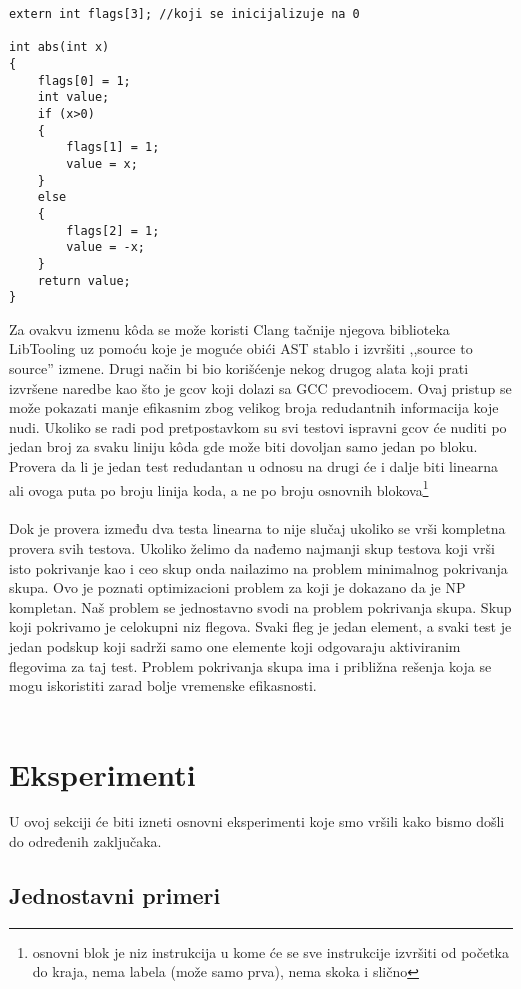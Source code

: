 \documentclass[a4paper]{article}
\begin{document}
\begin{lstlisting}
extern int flags[3]; //koji se inicijalizuje na 0

int abs(int x)
{
	flags[0] = 1;
	int value;
	if (x>0)
	{
		flags[1] = 1;
		value = x;
	}
	else
	{
		flags[2] = 1;
		value = -x;
	}
	return value;
}
\end{lstlisting}

Za ovakvu izmenu kôda se može koristi Clang tačnije njegova biblioteka LibTooling uz pomoću koje je moguće obići AST stablo i izvršiti ,,source to source'' izmene. Drugi način bi bio korišćenje nekog drugog alata koji prati izvršene naredbe kao što je gcov koji dolazi sa GCC prevodiocem. Ovaj pristup se može pokazati manje efikasnim zbog velikog broja redudantnih informacija koje nudi. Ukoliko se radi pod pretpostavkom su svi testovi ispravni gcov će nuditi po jedan broj za svaku liniju kôda gde može biti dovoljan samo jedan po bloku. Provera da li je jedan test redudantan u odnosu na drugi će i dalje biti linearna ali ovoga puta po broju linija koda, a ne po broju osnovnih blokova\footnote{osnovni blok je niz instrukcija u kome će se sve instrukcije izvršiti od početka do kraja, nema labela (može samo prva), nema skoka i slično} \\\\
Dok je provera između dva testa linearna to nije slučaj ukoliko se vrši kompletna provera svih testova. Ukoliko želimo da nađemo najmanji skup testova koji vrši isto pokrivanje kao i ceo skup onda nailazimo na problem minimalnog pokrivanja skupa. Ovo je poznati optimizacioni problem za koji je dokazano da je NP kompletan. Naš problem se jednostavno svodi na problem pokrivanja skupa. Skup koji pokrivamo je celokupni niz flegova. Svaki fleg je jedan element, a svaki test je jedan podskup koji sadrži samo one elemente koji odgovaraju aktiviranim flegovima za taj test. Problem pokrivanja skupa ima i približna rešenja koja se mogu iskoristiti zarad bolje vremenske efikasnosti. \\\\


\section{Eksperimenti}
\label{sec:first}
U ovoj sekciji će biti izneti osnovni eksperimenti koje smo vršili kako bismo došli do određenih zaključaka.

\subsection{Jednostavni primeri}
\label{sec:simpleexamples}
\end{document}
